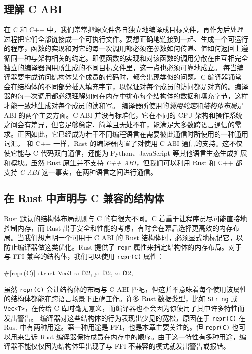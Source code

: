 \subsection{理解 C ABI}
\label{idx:idx_77b774f3}
\label{idx:idx_eb698869}
在 C 和 C++ 中，我们常常把源文件各自独立地编译成目标文件，再作为后处理过程把它们全部链接成一个可执行文件。要想正确地链接到一起、生成一个可运行的程序，函数的实现和对它的每一次调用都必须在参数如何传递、值如何返回上遵循同一种与架构相关的约定。即便函数的实现和对该函数的调用分散在由互相完全独立的编译器调用所生成的不同目标文件里，这一点也必须可靠地成立。
每当编译器要生成访问结构体某个成员的代码时，都会出现类似的问题。C 编译器通常会在结构体的不同部分插入填充字节，以保证对每个成员的访问都是对齐的。编译器的每一次调用都必须理解如何在内存中排布每个结构体的数据和填充字节，这样才能一致地生成对每个成员的读和写。
编译器所使用的\emph{调用约定}和\emph{结构体布局}是 ABI 的两个主要方面。C ABI 并没有标准化，它在不同的 CPU 架构和操作系统之间会有差异，但它足够稳定、简单且无处不在，能满足大多数跨语言通信的需求。正因如此，它已经成为若干不同编程语言在需要彼此通信时所使用的一种通用词汇。
\label{idx:idx_77d7d6ff}
和 C++ 一样，Rust 的编译器内置了对使用 C ABI 通信的支持。这不仅使它能与 C 代码双向通信，还能为 Python、JavaScript 等其他语言生态生成扩展和模块。虽然 Rust 原生并不支持 \emph{C++ ABI}，但我们可以利用 Rust 和 C++ 都支持 \emph{C ABI} 这一事实，在两种语言之间进行通信。
\subsection{在 Rust 中声明与 C 兼容的结构体}
\label{idx:idx_93fcdfe1}
Rust 默认的结构体布局规则与 C 的有很大不同。C 着重于让程序员尽可能直接地控制内存，而 Rust 出于安全和性能的考虑，有时会在幕后选择更高效的内存布局。当我们想声明一个可用于 C ABI 的 Rust 结构体时，必须显式地标记它，以防止编译器做这类优化。Rust 提供了 \texttt{repr} 属性来指定结构体的内存布局。对于与 FFI 兼容的结构体，我们可以使用 \texttt{repr(C)} 属性：
\begin{codebox}[rust]
#[repr(C)]
struct Vec3 {
    x: f32,
    y: f32,
    z: f32,
}
\end{codebox}
虽然 \texttt{repr(C)} 会让结构体的布局与 C ABI 匹配，但这并不意味着每个使用该属性的结构体都能在跨语言场景下正确工作。许多 Rust 数据类型，比如 \texttt{String} 或 \texttt{Vec<T>}，在传给 C 库时毫无意义，而编译器也不会因为你使用了其中许多特性而发出警告。
\label{idx:idx_b6eacb5d}
编译器对这些结构体的行为表现出少见的宽松，原因在于 \texttt{repr(C)} 在 Rust 中有两种用途。第一种用途是 FFI，也是本章主要关注的。但 \texttt{repr(C)} 也可以用来告诉 Rust 编译器保持成员在内存中的顺序。由于这一特性有多种用途，编译器不能仅仅因为结构体里出现了与 FFI 不兼容的模式就发出警告或报错。
